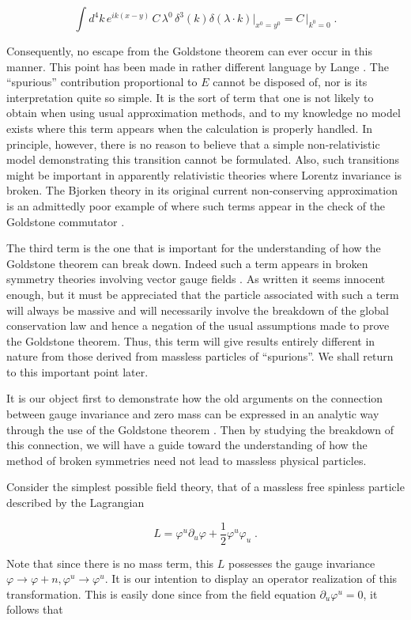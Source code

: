 \documentclass[%
  12pt,
  paper=letter,
  abstracton,
  pagesize=auto,
  version=last,
  DIV=calc
  ]{article}
\begin{document}
\[
  \int d^4k \,e^{ik(x-y)}\, C\, \lambda^{0}\, \delta^3(k)
  \delta(\lambda\cdot k)\big|_{x^{0}=y^{0}} = C\, \big|_{k^{0}=0}\; .
\]

Consequently, no escape from the Goldstone theorem can ever occur in
this manner.  This point has been made in rather different language by
Lange \cite{7}. The ``spurious'' contribution proportional to $E$ cannot
be disposed of, nor is its interpretation quite so simple.  It is the
sort of term that one is not likely to obtain when using usual
approximation methods, and to my knowledge no model exists where this
term appears when the calculation is properly handled.  In principle,
however, there is no reason to believe that a simple non-relativistic
model demonstrating this transition cannot be formulated.  Also, such
transitions might be important in apparently relativistic theories
where Lorentz invariance is broken.  The Bjorken theory in its
original current non-conserving approximation is an admittedly poor
example of where such terms appear in the check of the Goldstone
commutator \cite{8}.

The third term is the one that is important for the understanding of
how the Goldstone theorem can break down.  Indeed such a term appears
in broken symmetry theories involving vector gauge fields \cite{9}.
As written it seems innocent enough, but it must be appreciated that
the particle associated with such a term will always be massive and
will necessarily involve the breakdown of the global conservation law
and hence a negation of the usual assumptions made to prove the
Goldstone theorem.  Thus, this term will give results entirely
different in nature from those derived from massless particles of
``spurions''.  We shall return to this important point later.

It is our object first to demonstrate how the old arguments on the
connection between gauge invariance and zero mass can be expressed in
an analytic way through the use of the Goldstone theorem \cite{10}.
Then by studying the breakdown of this connection, we will have a guide
toward the understanding of how the method of broken symmetries need
not lead to massless physical particles.

Consider the simplest possible field theory, that of a massless free
spinless particle described by the Lagrangian

\[
  L=\varphi^u \partial_u \varphi + \frac{1}{2} \varphi^u \varphi_u \; .
\]

Note that since there is no mass term, this $L$ possesses the gauge
invariance $\varphi \rightarrow \varphi+n, \varphi^u \rightarrow
\varphi^u$. It is our intention to display an operator realization of
this transformation.  This is easily done since from the field
equation $\partial_u \varphi^u=0$, it follows that
\end{document}
